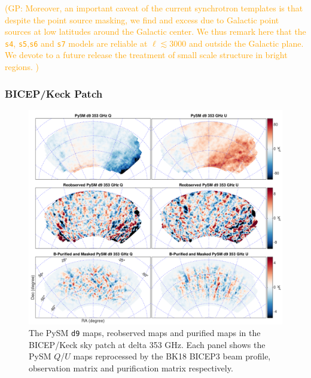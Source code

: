 \documentclass[twocolumn]{aastex631}
\newcommand{\giuse}[1]{\textcolor{orange}{(GP: #1)}}
\begin{document}
\giuse{Moreover, an important caveat of the current synchrotron templates is that despite the point source masking, we find and excess due to Galactic point sources at low   latitudes around the Galactic center. We thus remark here that the \texttt{s4}, \texttt{s5},\texttt{s6} and \texttt{s7} models  are reliable at $\ell \lesssim 3000 $ and outside the Galactic plane. We devote to a future release the treatment of small scale structure in bright regions. }


\subsubsection{BICEP/Keck Patch}

\begin{figure}
    \centering
    \includegraphics[width=2.\columnwidth]{figures/pysm_d9_353_delta_reobs_B_pub.pdf}
    \caption{The PySM \texttt{d9} maps, reobserved maps and purified maps in the BICEP/Keck sky patch at delta 353 GHz. Each panel shows the
    PySM $Q$/$U$ maps reprocessed by the BK18 BICEP3 beam profile, observation matrix and purification matrix respectively.}
    \label{fig:psym_BKmatrix}
\end{figure}
\end{document}
